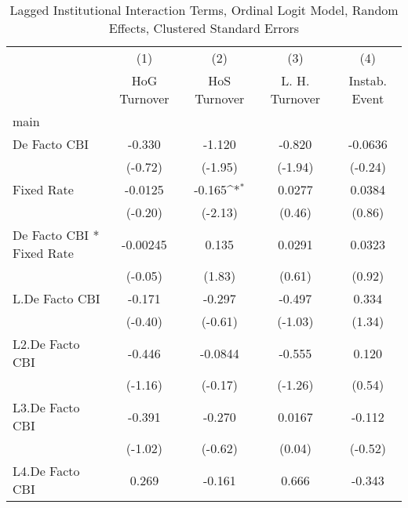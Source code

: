 {
\def\sym#1{\ifmmode^{#1}\else\(^{#1}\)\fi}
\begin{longtable}{l*{4}{c}}
\caption{Lagged Institutional Interaction Terms, Ordinal Logit Model, Random Effects, Clustered Standard Errors \label{intlagordLogLogDF}}\\
\hline\hline\endfirsthead\hline\endhead\hline\endfoot\endlastfoot
                &\multicolumn{1}{c}{(1)}&\multicolumn{1}{c}{(2)}&\multicolumn{1}{c}{(3)}&\multicolumn{1}{c}{(4)}\\
                &\multicolumn{1}{c}{HoG Turnover}&\multicolumn{1}{c}{HoS Turnover}&\multicolumn{1}{c}{L. H. Turnover}&\multicolumn{1}{c}{Instab. Event}\\
\hline
main            &                  &                  &                  &                  \\
De Facto CBI    &   -0.330         &   -1.120         &   -0.820         &  -0.0636         \\
                &  (-0.72)         &  (-1.95)         &  (-1.94)         &  (-0.24)         \\
[1em]
Fixed Rate      &  -0.0125         &   -0.165\sym{*}  &   0.0277         &   0.0384         \\
                &  (-0.20)         &  (-2.13)         &   (0.46)         &   (0.86)         \\
[1em]
De Facto CBI * Fixed Rate& -0.00245         &    0.135         &   0.0291         &   0.0323         \\
                &  (-0.05)         &   (1.83)         &   (0.61)         &   (0.92)         \\
[1em]
L.De Facto CBI  &   -0.171         &   -0.297         &   -0.497         &    0.334         \\
                &  (-0.40)         &  (-0.61)         &  (-1.03)         &   (1.34)         \\
[1em]
L2.De Facto CBI &   -0.446         &  -0.0844         &   -0.555         &    0.120         \\
                &  (-1.16)         &  (-0.17)         &  (-1.26)         &   (0.54)         \\
[1em]
L3.De Facto CBI &   -0.391         &   -0.270         &   0.0167         &   -0.112         \\
                &  (-1.02)         &  (-0.62)         &   (0.04)         &  (-0.52)         \\
[1em]
L4.De Facto CBI &    0.269         &   -0.161         &    0.666         &   -0.343         \\

\end{longtable}}
